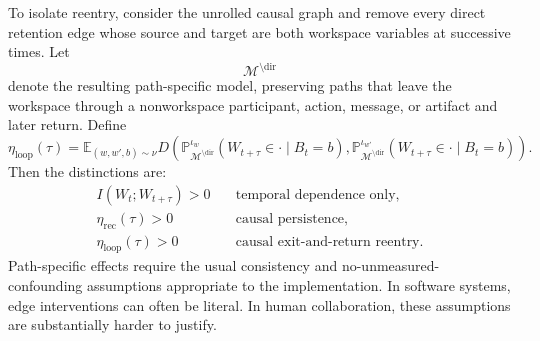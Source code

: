 To isolate reentry, consider the unrolled causal graph and remove every direct
retention edge whose source and target are both workspace variables at
successive times. Let
\[
\mathcal M^{\setminus\mathrm{dir}}
\]
denote the resulting path-specific model, preserving paths that leave the
workspace through a nonworkspace participant, action, message, or artifact and
later return. Define
\[
\boxed{
\eta_{\mathrm{loop}}(\tau)
=
\mathbb E_{(w,w',b)\sim\nu}
D\!\left(
\mathbb P_{\mathcal M^{\setminus\mathrm{dir}}}^{\iota_w}
(W_{t+\tau}\in\cdot\mid B_t=b),
\mathbb P_{\mathcal M^{\setminus\mathrm{dir}}}^{\iota_{w'}}
(W_{t+\tau}\in\cdot\mid B_t=b)
\right).
}
\]
Then the distinctions are:
\[
\begin{aligned}
I(W_t;W_{t+\tau})>0
&\quad\text{temporal dependence only},\\
\eta_{\mathrm{rec}}(\tau)>0
&\quad\text{causal persistence},\\
\eta_{\mathrm{loop}}(\tau)>0
&\quad\text{causal exit-and-return reentry}.
\end{aligned}
\]
Path-specific effects require the usual consistency and no-unmeasured-confounding
assumptions appropriate to the implementation. In software systems, edge
interventions can often be literal. In human collaboration, these assumptions
are substantially harder to justify.

